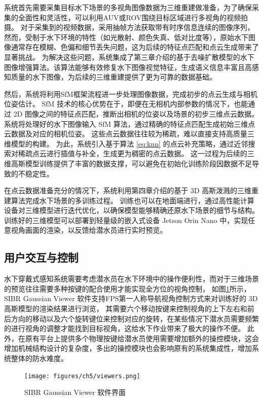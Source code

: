 系统首先需要采集目标水下场景的多视角图像数据为三维重建做准备，为了确保采集的全面性和灵活性，可以利用AUV或ROV围绕目标区域进行多视角的视频拍摄。
对于采集到的视频数据，采用抽帧方法获取带有时序信息连续的图像序列，然而，受制于水下环境的特性（如光散射、颜色失真、低对比度等），原始水下图像通常存在模糊、色偏和细节丢失问题，这为后续的特征点匹配和点云生成带来了显著挑战。
为解决这些问题，系统集成了第三章介绍的基于去噪扩散模型的水下图像增强算法。该算法能够有效修复水下图像视觉特征，生成语义信息丰富且高感知质量的水下图像，为后续的三维重建提供了更为可靠的数据基础。

然后，系统将利用SfM框架流程进一步处理图像数据，完成初步的点云生成与相机位姿估计。
SfM 技术的核心优势在于，即便在无相机内部参数的情况下，也能通过 2D 图像之间的特征点匹配，推断出相机的位姿以及场景的初步三维点云数据。
系统将处理好的水下图像输入 SfM 算法，通过精确的特征点匹配生成初始三维点云数据及对应的相机位姿。
这些点云数据往往较为稀疏，难以直接支持高质量三维模型的构建。
为此，系统引入基于算法 \ref{eq:knn} 的点云补充策略，通过近邻搜索对稀疏点云进行插值与补全，生成更为稠密的点云数据。
这一过程为后续的三维高斯模型训练提供了丰富的数据支撑，可以避免在初始化训练阶段因数据不足导致的不稳定性。

在点云数据准备充分的情况下，系统利用第四章介绍的基于 3D 高斯泼溅的三维重建算法完成水下场景的多训练过程。
训练也可以在地面端进行，通过高性能计算设备对三维模型进行迭代优化，以确保模型能够精确还原水下场景的细节与结构。
训练好的三维模型可以部署到轻量级的嵌入式设备 Jetson Orin Nano 中，实现任意视角画面的渲染，以反馈给潜水员进行实时预览。

\subsection{用户交互与控制}
水下穿戴式感知系统需要考虑潜水员在水下环境中的操作便利性，而对于三维场景的预览往往需要多种按键的配合使用才能实现全方位的视角控制，
如图\ref{img:gaussianviewer}所示，SIBR Gaussian Viewer 软件支持FPS第一人称导航视角控制方式来对训练好的 3D 高斯模型的渲染结果进行浏览，
其需要六个移动按键来控制视角的上下左右和前后方向的移动以及六个旋转键位来控制对应的旋转，在某些情况下潜水员需要频繁的进行视角的调整才能找到目标视角，这给水下作业带来了极大的操作不便。
此外，在原有平台上提供多个物理按键给潜水员使用需要增加额外的操控模块，这会增加机械结构设计的复杂度，多出的操控模块也会影响原有的系统集成性，增加系统整体的防水难度。
\begin{figure}[ht]
    \centering
    \vspace{0,4cm}
    \texttt{[image: figures/ch5/viewers.png]}
    \caption{SIBR Gaussian Viewer 软件界面}
    \label{img:gaussianviewer}
\end{figure}

